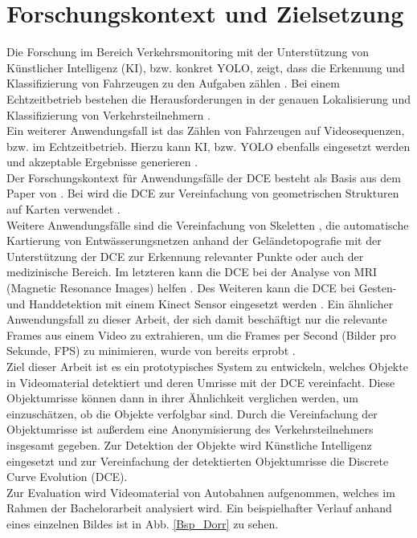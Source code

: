\section{Forschungskontext und Zielsetzung}
{%

Die Forschung im Bereich Verkehrsmonitoring mit der Unterstützung von Künstlicher Intelligenz (KI), bzw. konkret YOLO, zeigt, dass die Erkennung und Klassifizierung von Fahrzeugen zu den Aufgaben zählen \citep{Lin2021}. Bei einem Echtzeitbetrieb bestehen die Herausforderungen in der genauen Lokalisierung und Klassifizierung von Verkehrsteilnehmern \citep{Lin2021}. \\
Ein weiterer Anwendungsfall ist das Zählen von Fahrzeugen auf Videosequenzen, bzw. im Echtzeitbetrieb. Hierzu kann KI, bzw. YOLO ebenfalls eingesetzt werden und akzeptable Ergebnisse generieren \citep{Al-qaness2021}. \\

Der Forschungskontext für Anwendungsfälle der DCE besteht als Basis aus dem Paper von \citeauthor*{Dorr2015} \citep{Dorr2015}. Bei \citeauthor*{Barkowsky2000} wird die DCE zur Vereinfachung von geometrischen Strukturen auf Karten verwendet \citep{Barkowsky2000}. \\
Weitere Anwendungsfälle sind die Vereinfachung von Skeletten \citep{Latecki2007}, die automatische Kartierung von Entwässerungsnetzen anhand der Geländetopografie mit der Unterstützung der DCE zur Erkennung relevanter Punkte \citep{ZHENG201517} oder auch der medizinische Bereich. Im letzteren kann die DCE bei der Analyse von MRI (Magnetic Resonance Images) helfen \citep{Supot2007}. Des Weiteren kann die DCE bei Gesten- und Handdetektion mit einem Kinect Sensor eingesetzt werden \citep{Lai2016}. Ein ähnlicher Anwendungsfall zu dieser Arbeit, der sich damit beschäftigt nur die relevante Frames aus einem Video zu extrahieren, um die Frames per Second (\glqq Bilder pro Sekunde\grqq{}, FPS) zu minimieren, wurde von \citeauthor*{Latecki2000a} bereits erprobt \citep{Latecki2000a}. \\

Ziel dieser Arbeit ist es ein prototypisches System zu entwickeln, welches Objekte in Videomaterial detektiert und deren Umrisse mit der DCE vereinfacht. Diese Objektumrisse können dann in ihrer Ähnlichkeit verglichen werden, um einzuschätzen, ob die Objekte verfolgbar sind. Durch die Vereinfachung der Objektumrisse ist außerdem eine Anonymisierung des Verkehrsteilnehmers insgesamt gegeben. Zur Detektion der Objekte wird Künstliche Intelligenz eingesetzt und zur Vereinfachung der detektierten Objektumrisse die Discrete Curve Evolution (DCE). \\
Zur Evaluation wird Videomaterial von Autobahnen aufgenommen, welches im Rahmen der Bachelorarbeit analysiert wird. Ein beispielhafter Verlauf anhand eines einzelnen Bildes ist in Abb. \ref{Bsp_Dorr} zu sehen. \\

}
